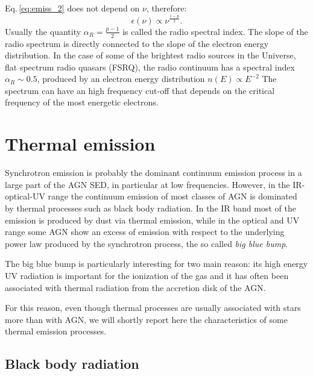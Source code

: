\documentclass[../thesis.tex]{subfiles}
\begin{document}
Eq.\,\ref{eq:emiss_2} does not depend on $\nu$, therefore:
\begin{equation}
    \label{eq:emiss_3}
    \epsilon(\nu) \propto \nu^{\frac{1-p}{2}}.
\end{equation}
Usually the quantity $\alpha_R = \frac{p-1}{2}$ is called the radio spectral index.
The slope of the radio spectrum is directly connected to the slope of the electron energy distribution.
In the case of some of the brightest radio sources in the Universe, flat spectrum radio quasars (FSRQ), the radio continuum has a spectral index $\alpha_R \sim 0.5$, produced by an electron energy distribution $n(E)\propto E^{-2}$
The spectrum can have an high frequency cut-off that depends on the critical frequency of the most energetic electrons.

\section{Thermal emission}
\label{sec:thermal_emission}

Synchrotron emission is probably the dominant continuum emission process in a large part of the AGN SED, in particular at low frequencies.
However, in the IR-optical-UV range the continuum emission of most classes of AGN is dominated by thermal processes such as black body radiation.
In the IR band most of the emission is produced by dust via thermal emission, while in the optical and UV range some AGN show an excess of emission with respect to the underlying power law produced by the synchrotron process, the so called \emph{big blue bump}.

The big blue bump is particularly interesting for two main reason: its high energy UV radiation is important for the ionization of the gas and it has often been associated with thermal radiation from the accretion disk of the AGN.

For this reason, even though thermal processes are usually associated with stars more than with AGN, we will shortly report here the characteristics of some thermal emission processes.

\subsection{Black body radiation}
\end{document}
